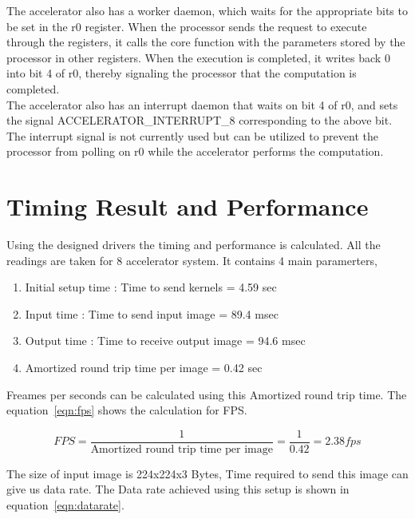 \documentclass[12pt]{report}
\begin{document}
The accelerator also has a worker daemon, which waits for the appropriate bits to be set in the r0 register. When the processor sends the request to execute through the registers, it calls the core function with the parameters stored by the processor in other registers. When the execution is completed, it writes back 0 into bit 4 of r0, thereby signaling the processor that the computation is completed.
\\

The accelerator also has an interrupt daemon that waits on bit 4 of r0, and sets the signal ACCELERATOR\_INTERRUPT\_8 corresponding to the above bit. The interrupt signal is not currently used but can be utilized to prevent the processor from polling on r0 while the accelerator performs the computation.
\\

\section{Timing Result and Performance}

	Using the designed drivers the timing and performance is calculated. All the readings are taken for 8 accelerator system. 
	It contains 4 main paramerters, 

	\begin{enumerate}
		\item Initial setup time : Time to send kernels = 4.59 sec
		\item Input time : Time to send input image = 89.4 msec
		\item Output time : Time to receive output image = 94.6 msec
		\item Amortized round trip time per image = 0.42 sec
	\end{enumerate}

	Freames per seconds can be calculated using this Amortized round trip time. The equation~\ref{eqn:fps} shows the calculation for FPS.

	\begin{center}

		\begin{equation}\label{eqn:fps}
				FPS = \frac {1} {\text{Amortized round trip time per image}} = \frac{1}{0.42} = 2.38 fps	
		\end{equation}
	\end{center}

	The size of input image is 224x224x3 Bytes, Time required to send this image can give us data rate. 
	The Data rate achieved using this setup is shown in equation~\ref{eqn:datarate}.
\end{document}
